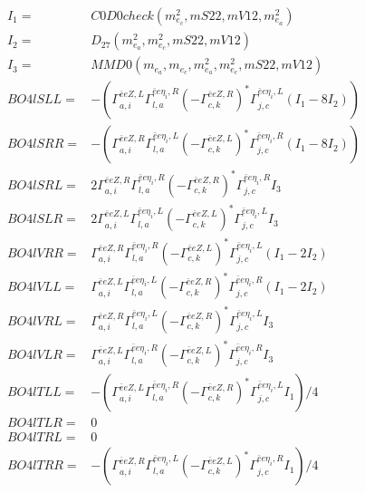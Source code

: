 \documentclass[A4,landscape]{article}
\begin{document}
\begin{align} 
I_1 = & C0D0check(m^2_{e_{{c}}}, mS22, mV12, m^2_{e_{{a}}}) \\ 
I_2 = & D_{27}(m^2_{e_{{a}}}, m^2_{e_{{c}}}, mS22, mV12) \\ 
I_3 = & MMD0(m_{e_{{a}}}, m_{e_{{c}}}, m^2_{e_{{a}}}, m^2_{e_{{c}}}, mS22, mV12) \\ 
  BO4lSLL= & -( \Gamma^{\bar{e}e Z ,L}_{a, i} \Gamma^{\bar{e}e \eta_i ,R}_{l, a} (- \Gamma^{\bar{e}e Z ,R} _{c, k})^* \Gamma^{\bar{e}e \eta_i ,L}_{j, c} (I_1 - 8 I_2)) \\ 
  BO4lSRR= & -( \Gamma^{\bar{e}e Z ,R}_{a, i} \Gamma^{\bar{e}e \eta_i ,L}_{l, a} (- \Gamma^{\bar{e}e Z ,L} _{c, k})^* \Gamma^{\bar{e}e \eta_i ,R}_{j, c} (I_1 - 8 I_2)) \\ 
  BO4lSRL= & 2  \Gamma^{\bar{e}e Z ,R}_{a, i} \Gamma^{\bar{e}e \eta_i ,R}_{l, a} (- \Gamma^{\bar{e}e Z ,R} _{c, k})^* \Gamma^{\bar{e}e \eta_i ,R}_{j, c} I_3 \\ 
  BO4lSLR= & 2  \Gamma^{\bar{e}e Z ,L}_{a, i} \Gamma^{\bar{e}e \eta_i ,L}_{l, a} (- \Gamma^{\bar{e}e Z ,L} _{c, k})^* \Gamma^{\bar{e}e \eta_i ,L}_{j, c} I_3 \\ 
  BO4lVRR= &  \Gamma^{\bar{e}e Z ,R}_{a, i} \Gamma^{\bar{e}e \eta_i ,R}_{l, a} (- \Gamma^{\bar{e}e Z ,L} _{c, k})^* \Gamma^{\bar{e}e \eta_i ,L}_{j, c} (I_1 - 2 I_2) \\ 
  BO4lVLL= &  \Gamma^{\bar{e}e Z ,L}_{a, i} \Gamma^{\bar{e}e \eta_i ,L}_{l, a} (- \Gamma^{\bar{e}e Z ,R} _{c, k})^* \Gamma^{\bar{e}e \eta_i ,R}_{j, c} (I_1 - 2 I_2) \\ 
  BO4lVRL= &  \Gamma^{\bar{e}e Z ,R}_{a, i} \Gamma^{\bar{e}e \eta_i ,L}_{l, a} (- \Gamma^{\bar{e}e Z ,R} _{c, k})^* \Gamma^{\bar{e}e \eta_i ,L}_{j, c} I_3 \\ 
  BO4lVLR= &  \Gamma^{\bar{e}e Z ,L}_{a, i} \Gamma^{\bar{e}e \eta_i ,R}_{l, a} (- \Gamma^{\bar{e}e Z ,L} _{c, k})^* \Gamma^{\bar{e}e \eta_i ,R}_{j, c} I_3 \\ 
  BO4lTLL= & -( \Gamma^{\bar{e}e Z ,L}_{a, i} \Gamma^{\bar{e}e \eta_i ,R}_{l, a} (- \Gamma^{\bar{e}e Z ,R} _{c, k})^* \Gamma^{\bar{e}e \eta_i ,L}_{j, c} I_1)/4 \\ 
  BO4lTLR= & 0 \\ 
  BO4lTRL= & 0 \\ 
  BO4lTRR= & -( \Gamma^{\bar{e}e Z ,R}_{a, i} \Gamma^{\bar{e}e \eta_i ,L}_{l, a} (- \Gamma^{\bar{e}e Z ,L} _{c, k})^* \Gamma^{\bar{e}e \eta_i ,R}_{j, c} I_1)/4 \\ 
\end{align} 
\end{document}
